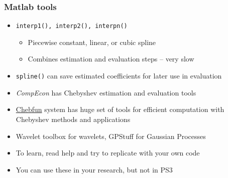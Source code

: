 \documentclass[bigger]{beamer}
\begin{document}
\begin{frame}%

\frametitle{Matlab tools}

\begin{itemize}
\item \texttt{interp1(), interp2(), interpn()}

\begin{itemize}
\item Piecewise constant, linear, or cubic spline

\item Combines estimation and evaluation steps\newline
-- very slow
\end{itemize}

\item \texttt{spline()} can save estimated coefficients for later use in
evaluation

\item \emph{CompEcon} has Chebyshev estimation and evaluation tools
\item \href{http://www.chebfun.org/publications/}{Chebfun} system has huge set of tools for efficient computation with Chebyshev methods and applications
\item Wavelet toolbox for wavelets, GPStuff for Gaussian Processes

\item To learn, read help and try to replicate with your own code

\item You can use these in your research, but not in PS3
\end{itemize}


\end{frame}%
\end{document}
